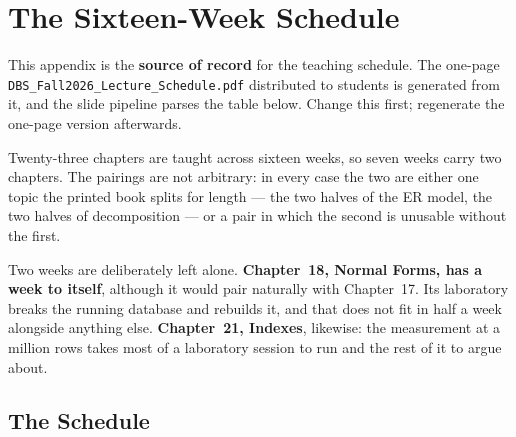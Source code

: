\chapter{The Sixteen-Week Schedule}\label{app:schedule}
\normalfigures

This appendix is the \textbf{source of record} for the teaching schedule. The
one-page \texttt{DBS\_Fall2026\_Lecture\_Schedule.pdf} distributed to students
is generated from it, and the slide pipeline parses the table below. Change
this first; regenerate the one-page version afterwards.

Twenty-three chapters are taught across sixteen weeks, so seven weeks carry
two chapters. The pairings are not arbitrary: in every case the two are either
one topic the printed book splits for length --- the two halves of the ER
model, the two halves of decomposition --- or a pair in which the second is
unusable without the first.

Two weeks are deliberately left alone. \textbf{Chapter~18, Normal Forms, has a
week to itself}, although it would pair naturally with Chapter~17. Its
laboratory breaks the running database and rebuilds it, and that does not fit
in half a week alongside anything else. \textbf{Chapter~21, Indexes}, likewise:
the measurement at a million rows takes most of a laboratory session to run
and the rest of it to argue about.

\section{The Schedule}

